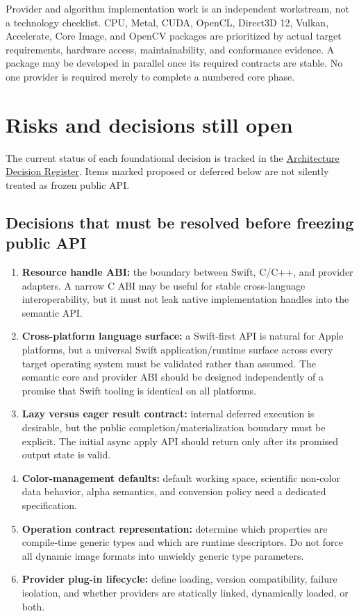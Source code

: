\documentclass[11pt,a4paper,oneside]{article}
\begin{document}
Provider and algorithm implementation work is an independent workstream, not a technology checklist. CPU, Metal, CUDA, OpenCL, Direct3D 12, Vulkan, Accelerate, Core Image, and OpenCV packages are prioritized by actual target requirements, hardware access, maintainability, and conformance evidence. A package may be developed in parallel once its required contracts are stable. No one provider is required merely to complete a numbered core phase.

\section{Risks and decisions still open}

The current status of each foundational decision is tracked in the \href{https://github.com/Shennagyp/ImageProcessing/blob/main/docs/research/architecture/decisions/Decision-Register.md}{Architecture Decision Register}. Items marked proposed or deferred below are not silently treated as frozen public API.

\subsection{Decisions that must be resolved before freezing public API}

\begin{enumerate}
  \item \textbf{Resource handle ABI:} the boundary between Swift, C/C++, and provider adapters. A narrow C ABI may be useful for stable cross-language interoperability, but it must not leak native implementation handles into the semantic API.
  \item \textbf{Cross-platform language surface:} a Swift-first API is natural for Apple platforms, but a universal Swift application/runtime surface across every target operating system must be validated rather than assumed. The semantic core and provider ABI should be designed independently of a promise that Swift tooling is identical on all platforms.
  \item \textbf{Lazy versus eager result contract:} internal deferred execution is desirable, but the public completion/materialization boundary must be explicit. The initial async apply API should return only after its promised output state is valid.
  \item \textbf{Color-management defaults:} default working space, scientific non-color data behavior, alpha semantics, and conversion policy need a dedicated specification.
  \item \textbf{Operation contract representation:} determine which properties are compile-time generic types and which are runtime descriptors. Do not force all dynamic image formats into unwieldy generic type parameters.
  \item \textbf{Provider plug-in lifecycle:} define loading, version compatibility, failure isolation, and whether providers are statically linked, dynamically loaded, or both.
\end{enumerate}
\end{document}
